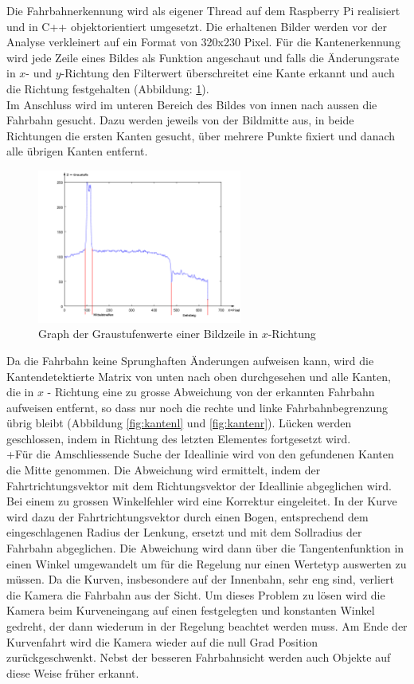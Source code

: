 Die Fahrbahnerkennung wird als eigener Thread auf dem Raspberry Pi realisiert und in C++ objektorientiert umgesetzt. Die erhaltenen Bilder werden vor der Analyse verkleinert auf ein Format von 320x230 Pixel. Für die Kantenerkennung wird jede Zeile eines Bildes als Funktion angeschaut und falls die Änderungsrate in $x$- und $y$-Richtung den Filterwert überschreitet eine Kante erkannt und auch die Richtung festgehalten (Abbildung: \ref{fig:grayscale}).\\
Im Anschluss wird im unteren Bereich des Bildes von innen nach aussen die Fahrbahn gesucht. Dazu werden jeweils von der Bildmitte aus, in beide Richtungen die ersten Kanten gesucht, über mehrere Punkte fixiert und danach alle übrigen Kanten entfernt.
\begin{figure}[H]%
\centering
\includegraphics[width=0.6\textwidth]{03_Loesungskonzept/pictures/graphPicture.png}
\caption{Graph der Graustufenwerte einer Bildzeile in $x$-Richtung}
\label{fig:grayscale}
\end{figure}\flushleft
Da die Fahrbahn keine Sprunghaften Änderungen aufweisen kann, wird die Kantendetektierte Matrix von unten nach oben durchgesehen und alle Kanten, die in $x$ - Richtung eine zu grosse Abweichung von der erkannten Fahrbahn aufweisen entfernt, so dass nur noch die rechte und linke Fahrbahnbegrenzung übrig bleibt (Abbildung \ref{fig:kantenl} und \ref{fig:kantenr}). Lücken werden geschlossen, indem in Richtung des letzten Elementes fortgesetzt wird.\\
+Für die Amschliessende Suche der Ideallinie wird von den gefundenen Kanten die Mitte genommen. Die Abweichung wird ermittelt, indem der Fahrtrichtungsvektor mit dem Richtungsvektor der Ideallinie abgeglichen wird. Bei einem zu grossen Winkelfehler wird eine Korrektur eingeleitet. In der Kurve wird dazu der Fahrtrichtungsvektor durch einen Bogen, entsprechend dem eingeschlagenen Radius der Lenkung, ersetzt und mit dem Sollradius der Fahrbahn abgeglichen. Die Abweichung wird dann über die Tangentenfunktion in einen Winkel umgewandelt um für die Regelung nur einen Wertetyp auswerten zu müssen. Da die Kurven, insbesondere auf der Innenbahn, sehr eng sind, verliert die Kamera die Fahrbahn aus der Sicht. Um dieses Problem zu lösen wird die Kamera beim Kurveneingang auf einen festgelegten und konstanten Winkel gedreht, der dann wiederum in der Regelung beachtet werden muss. Am Ende der Kurvenfahrt wird die Kamera wieder auf die null Grad Position zurückgeschwenkt. Nebst der besseren Fahrbahnsicht werden auch Objekte auf diese Weise früher erkannt.
